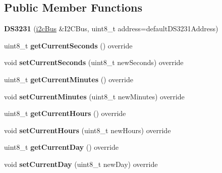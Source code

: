\subsection*{Public Member Functions}
\begin{DoxyCompactItemize}
\item 
\mbox{\label{class_d_s3231_a316537e9a09ce7ef57c1955785f1fa24}} 
{\bfseries D\+S3231} (\mbox{\hyperlink{classi2c_bus}{i2c\+Bus}} \&I2\+C\+Bus, uint8\+\_\+t address=default\+D\+S3231\+Address)
\item 
\mbox{\label{class_d_s3231_a8a5357eae07991d94f8f7610a3f3073a}} 
uint8\+\_\+t {\bfseries get\+Current\+Seconds} () override
\item 
\mbox{\label{class_d_s3231_ac73512cc6c2a37ffb21bee74ea835a09}} 
void {\bfseries set\+Current\+Seconds} (uint8\+\_\+t new\+Seconds) override
\item 
\mbox{\label{class_d_s3231_a08f384e1897214d4a201aaaecde3b8a4}} 
uint8\+\_\+t {\bfseries get\+Current\+Minutes} () override
\item 
\mbox{\label{class_d_s3231_a221f92091b813108b3515f6676be29c8}} 
void {\bfseries set\+Current\+Minutes} (uint8\+\_\+t new\+Minutes) override
\item 
\mbox{\label{class_d_s3231_a019d8ed8074a02937c0777424be3d0ae}} 
uint8\+\_\+t {\bfseries get\+Current\+Hours} () override
\item 
\mbox{\label{class_d_s3231_ae59c15abcccd8e27eadebcd150db810e}} 
void {\bfseries set\+Current\+Hours} (uint8\+\_\+t new\+Hours) override
\item 
\mbox{\label{class_d_s3231_a813bbe55a08e1911d498511795721477}} 
uint8\+\_\+t {\bfseries get\+Current\+Day} () override
\item 
\mbox{\label{class_d_s3231_ae43a887db6022008c066a257acd68ae8}} 
void {\bfseries set\+Current\+Day} (uint8\+\_\+t new\+Day) override
\item 
\mbox{\label{class_d_s3231_a346341a4d3c6615103b33fbff7a12884}} 

\end{DoxyCompactItemize}
